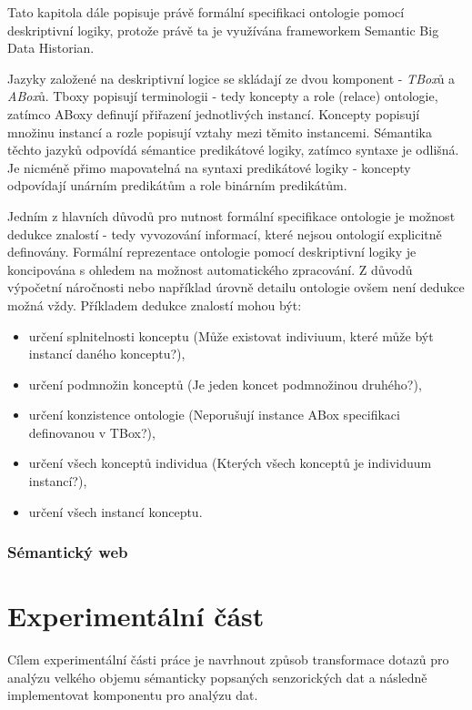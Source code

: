\documentclass[11pt,twoside,a4paper]{book}
\begin{document}
		Tato kapitola dále popisuje právě formální specifikaci ontologie pomocí deskriptivní logiky, protože právě ta je využívána frameworkem Semantic Big Data Historian.

		Jazyky založené na deskriptivní logice se skládají ze dvou komponent - \textit{TBox}ů a \textit{ABox}ů. Tboxy popisují terminologii - tedy koncepty a role (relace) ontologie, zatímco ABoxy definují přiřazení jednotlivých instancí. Koncepty popisují množinu instancí a rozle popisují vztahy mezi těmito instancemi. 
		Sémantika těchto jazyků odpovídá sémantice predikátové logiky, zatímco syntaxe je odlišná. Je nicméně přimo mapovatelná na syntaxi predikátové logiky - koncepty odpovídají unárním predikátům a role binárním predikátům.\cite{deslogb02}

		Jedním z hlavních důvodů pro nutnost formální specifikace ontologie je možnost dedukce znalostí - tedy vyvozování informací, které nejsou ontologií explicitně definovány. Formální reprezentace ontologie pomocí deskriptivní logiky je koncipována s ohledem na možnost automatického zpracování. Z důvodů výpočetní náročnosti nebo například úrovně detailu ontologie ovšem není dedukce možná vždy. Příkladem dedukce znalostí mohou být:\cite{ontologieh08}
\begin{itemize}
\item{určení splnitelnosti konceptu (Může existovat indiviuum, které může být instancí daného konceptu?),}
\item{určení podmnožin konceptů (Je jeden koncet podmnožinou druhého?),}
\item{určení konzistence ontologie (Neporušují instance ABox specifikaci definovanou v TBox?), }
\item{určení všech konceptů individua (Kterých všech konceptů je individuum instancí?),}
\item{určení všech instancí konceptu.}
\end{itemize}

		\subsection{Sémantický web} %
	
\chapter{Experimentální část}
	Cílem experimentální části práce je navrhnout způsob transformace dotazů pro analýzu velkého objemu sémanticky popsaných senzorických dat a následně implementovat komponentu pro analýzu dat. 
 
\end{document}
